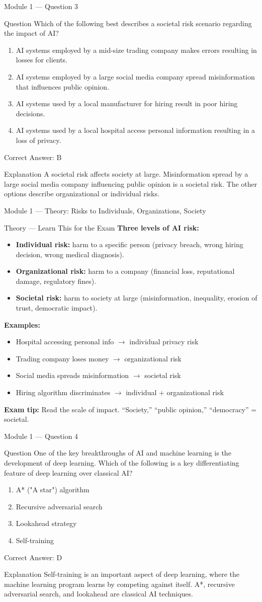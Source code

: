 \documentclass[aspectratio=169,10pt]{beamer}
\newcommand{\question}[1]{%
	\begin{block}{Question}
		#1
	\end{block}
}
\newcommand{\options}[4]{%
	\begin{enumerate}[label=\Alph*.,leftmargin=*]
		\item #1
		\item #2
		\item #3
		\item #4
	\end{enumerate}
}
\newcommand{\answerbox}[1]{%
	\begin{exampleblock}{Correct Answer: #1}
	\end{exampleblock}
}
\newcommand{\explain}[1]{%
	\begin{block}{Explanation}
		\small #1
	\end{block}
}
\newcommand{\theory}[1]{%
	\begin{block}{Theory --- Learn This for the Exam}
		\small #1
	\end{block}
}
\begin{document}
	\begin{frame}{Module 1 --- Question 3}
		\question{Which of the following best describes a societal risk scenario regarding the impact of AI?}
		\options{AI systems employed by a mid-size trading company makes errors resulting in losses for clients.}{AI systems employed by a large social media company spread misinformation that influences public opinion.}{AI systems used by a local manufacturer for hiring result in poor hiring decisions.}{AI systems used by a local hospital access personal information resulting in a loss of privacy.}
		\answerbox{B}
		\explain{A societal risk affects society at large. Misinformation spread by a large social media company influencing public opinion is a societal risk. The other options describe organizational or individual risks.}
	\end{frame}
	
	\begin{frame}{Module 1 --- Theory: Risks to Individuals, Organizations, Society}
		\theory{
			\textbf{Three levels of AI risk:}
			\begin{itemize}
				\item \textbf{Individual risk:} harm to a specific person (privacy breach, wrong hiring decision, wrong medical diagnosis).
				\item \textbf{Organizational risk:} harm to a company (financial loss, reputational damage, regulatory fines).
				\item \textbf{Societal risk:} harm to society at large (misinformation, inequality, erosion of trust, democratic impact).
			\end{itemize}
			\textbf{Examples:}
			\begin{itemize}
				\item Hospital accessing personal info $\rightarrow$ individual privacy risk
				\item Trading company loses money $\rightarrow$ organizational risk
				\item Social media spreads misinformation $\rightarrow$ societal risk
				\item Hiring algorithm discriminates $\rightarrow$ individual + organizational risk
			\end{itemize}
			\textbf{Exam tip:} Read the scale of impact. ``Society,'' ``public opinion,'' ``democracy'' = societal.
		}
	\end{frame}
	
	\begin{frame}{Module 1 --- Question 4}
		\question{One of the key breakthroughs of AI and machine learning is the development of deep learning. Which of the following is a key differentiating feature of deep learning over classical AI?}
		\options{A* ("A star") algorithm}{Recursive adversarial search}{Lookahead strategy}{Self-training}
		\answerbox{D}
		\explain{Self-training is an important aspect of deep learning, where the machine learning program learns by competing against itself. A*, recursive adversarial search, and lookahead are classical AI techniques.}
	\end{frame}
	
\end{document}
